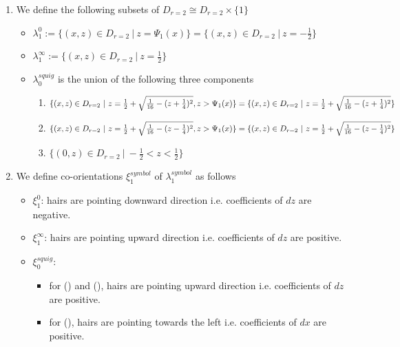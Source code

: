 \begin{definition}
\begin{enumerate}
\item We define the following subsets of $D_{r=2} \cong D_{r=2}\times \{1\}$
\begin{itemize}
\item $\lambda_1^0 := \{(x,z) \in D_{r=2} ~|~ z = \Psi_1(x)\} = \{(x,z) \in D_{r=2} ~|~ z = -\frac{1}{2}\}$

\item $\lambda_1^\infty := \{(x,z) \in D_{r=2} ~|~ z = \frac{1}{2} \}$

\item $\lambda_0^{squig}$ is the union of the following three components
\begin{enumerate}[label=(\roman*)]

\item $\{(x,z) \in D_{r=2} ~|~ z = \frac{1}{2} + \sqrt{\frac{1}{16} - (z+\frac{1}{4})^2}, z > \Psi_1(x) \}\\ = \{(x,z) \in D_{r=2} ~|~ z = \frac{1}{2} + \sqrt{\frac{1}{16} - (z+\frac{1}{4})^2} \}$

\item $\{(x,z) \in D_{r=2} ~|~ z = \frac{1}{2} + \sqrt{\frac{1}{16} - (z-\frac{1}{4})^2}, z > \Psi_1(x) \}\\ = \{(x,z) \in D_{r=2} ~|~ z = \frac{1}{2} + \sqrt{\frac{1}{16} - (z-\frac{1}{4})^2} \}$

\item $\{(0,z) \in D_{r=2} ~|~ -\frac{1}{2} < z < \frac{1}{2} \}$
\end{enumerate}
\end{itemize}

\item We define co-orientations $\xi_1^{symbol}$ of $\lambda_1^{symbol}$ as follows
\begin{itemize}
\item $\xi_1^0$: hairs are pointing downward direction i.e. coefficients of $dz$ are negative.

\item $\xi_1^\infty$: hairs are pointing upward direction i.e. coefficients of $dz$ are positive.

\item $\xi_0^{squig}$: 
\begin{itemize}
\item for () and (), hairs are pointing upward direction i.e. coefficients of $dz$ are positive.
\item for (), hairs are pointing towards the left i.e. coefficients of $dx$ are positive.
\end{itemize}
\end{itemize}
\end{enumerate}
\end{definition}

